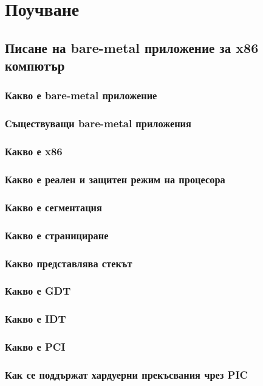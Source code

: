 \chapter{Поучване} %
\section{Писане на bare-metal приложение за x86 компютър}
  \subsection{Какво е bare-metal приложение}
  \subsection{Съществуващи bare-metal приложения}
  \subsection{Какво е x86}
  \subsection{Какво е реален и защитен режим на процесора}
  \subsection{Какво е сегментация}
  \subsection{Какво е странициране}
  \subsection{Какво представлява стекът}
  \subsection{Какво е GDT}
  \subsection{Какво е IDT}
  \subsection{Какво е PCI}
  \subsection{Как се поддържат хардуерни прекъсвания чрез PIC}
